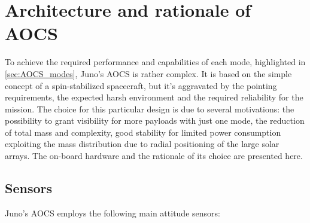 \section{Architecture and rationale of AOCS}
\label{sec:AOCS_architecture_rationale}

To achieve the required performance and capabilities of each mode, highlighted in \autoref{sec:AOCS_modes}, Juno's AOCS is rather complex.
It is based on the simple concept of a spin-stabilized spacecraft, but it's aggravated by the pointing requirements, the expected harsh environment and the required reliability for the mission.
The choice for this particular design is due to several motivations: the possibility to grant visibility for more payloads with just one mode, the reduction of total mass and complexity, good stability for limited power consumption exploiting the mass distribution due to radial positioning of the large solar arrays.
The on-board hardware and the rationale of its choice are presented here.

\subsection{Sensors}
\label{subsec:Sensors}

Juno's AOCS employs the following main attitude sensors:

